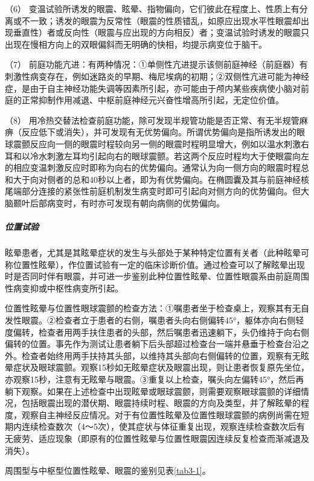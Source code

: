 （6）
变温试验所诱发的眼震、眩晕、指物偏向，它们彼此在程度上、性质上有分离或不一致；诱发的眼震为反常性（眼震的性质错乱，如原应出现水平性眼震却出现垂直性）者或反向性（眼震与应出现的方向相反）者；变温试验时诱发的眼震只出现在慢相方向上的双眼偏斜而无明确的快相，均提示病变位于脑干。

（7）
前庭功能亢进：有两种情况：①单侧性亢进提示该侧前庭神经（前庭器）有刺激性病变存在，例如迷路炎的早期、梅尼埃病的初期；②双侧性亢进可能为神经症，是由于自主神经功能失调等因素所引起，亦可能由于颅内某些疾病使小脑对前庭的正常抑制作用减退、中枢前庭神经元兴奋性增高所引起，无定位价值。

（8）
用冷热交替法检查前庭功能，除可发现半规管功能是否正常、有无半规管麻痹（反应低下或消失），并可发现有无优势偏向。所谓优势偏向是指所诱发出的眼球震颤反应向一侧的眼震时程较向另一侧的眼震时程明显增大，例如以温水刺激右耳和以冷水刺激左耳均引起向右的眼球震颤。若这两个反应时程均大于使眼震向左的相应变温刺激反应时即称为向右的优势偏向。通常认为向一侧方向的眼震时程总和大于向对侧者的总和40秒以上者，即为有优势偏向。在椭圆囊及其与前庭神经核尾端部分连接的紧张性前庭机制发生病变时即可引起向对侧方向的优势偏向。但大脑颞叶后部病变时，有时亦可发现有朝向病侧的优势偏向。

\subparagraph{位置试验}

眩晕患者，尤其是其眩晕症状的发生与头部处于某种特定位置有关者（此种眩晕可称位置性眩晕），作位置试验有一定的临床诊断价值。通过检查可以了解眩晕出现时是否同时伴有眼震，并可进一步鉴别此种位置性眩晕、位置性眼震系由前庭周围性病变抑或中枢性病变所引起。

位置性眩晕与位置性眼球震颤的检查方法：①嘱患者坐于检查桌上，观察其有无自发性眼震。②检查者立于患者的右侧，嘱患者头向右侧偏转45°，躯体亦向右侧轻度偏转，检查者用两手扶住患者的头部，然后嘱患者迅速躺下，头仍维持于向右侧偏转的位置。事先作为测试让患者躺下后头部超过检查台一端并悬垂于检查台沿之外。检查者始终用两手扶持其头部，以维持其头部向右侧偏转的位置，观察有无眩晕症状及眼球震颤。观察15秒如无眩晕症状及眼震出现，则让患者恢复原先坐位，亦观察15秒，注意有无眩晕与眼震。③重复以上检查，嘱头向左偏转45°，然后再躺下观察。如果在上述检查中出现眩晕或眼球震颤，则需要观察眼球震颤的详细情况，包括眼震出现的潜伏期、眼震持续时程、眼震的方向及类型，并了解眩晕的程度，观察自主神经反应情况。对于有位置性眩晕及位置性眼球震颤的病例尚需在短期内连续检查数次（4～5次），使其症状与体征重复出现，观察连续检查数次后有无疲劳、适应现象（即原有的位置性眩晕与位置性眼震因连续反复检查而渐减退及消失）。

周围型与中枢型位置性眩晕、眼震的鉴别见表\ref{tab3-1}。

